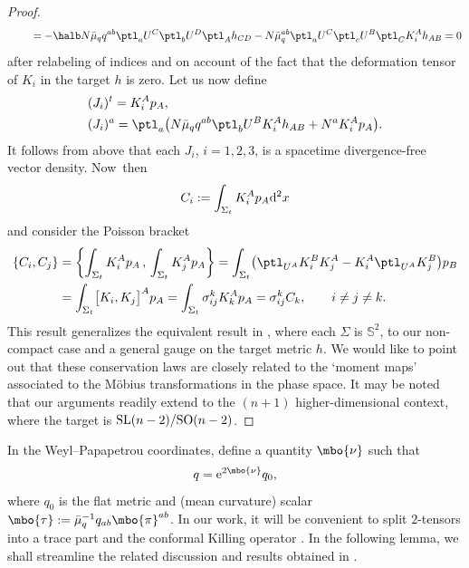 \begin{proof}
\begin{gather*}
\qquad{}= -\halb N \bar{\mu}_q q^{ab} \ptl_a U^C \ptl_b U^D \ptl_A h_{CD}- N \bar{\mu}_q^{ab} \ptl_a U^C \ptl_c U^B \ptl_C K_i^A h_{AB} = 0
\end{gather*}
after relabeling of indices and on account of the fact that the deformation tensor of $K_i$ in the target $h$ is zero. Let us now define
\begin{align*}
&(J_i)^t = K^A_i p_A,\\
&(J_i)^a = \ptl_a \bigl(N \bar{\mu}_q q^{ab} \ptl_b U^B K_i^A h_{AB} + N^a K_i^A p_A\bigr).
\end{align*}
It follows from above that each $J_i$, $i = 1, 2, 3$, is a spacetime divergence-free vector density. Now~then
\begin{align*}
C_i := \int_{\Sigma_t}K_i^A p_A {\rm d}^2 x
\end{align*}
and consider the Poisson bracket
\begin{align*}
\{ C_i, C_j \} &{}= \biggl\{ \int_{\Sigma_t} K^A_i p_A \,,\, \int_{\Sigma_t} K^A_j p_A \biggr\}
= \int_{\Sigma_t} \bigl(\ptl_{U^A} K^B_i K^A_j - K^A_i \ptl_{U^A} K^B_j \bigr) p_B \\
&{}= \int_{\Sigma_t} \bigl[K_i, K_j \bigr]^A p_A = \int_{\Sigma_t} \sigma^k_{ij} K^A_k p_A
= \sigma^k_{ij} C_k, \qquad i \neq j \neq k.
\end{align*}
This result generalizes the equivalent result in \cite{kaluz1}, where each $\Sigma$ is $\mathbb{S}^2$, to our non-compact case and a general gauge on the target metric $h$. We would like to point out that these conservation laws are closely related to the `moment maps' associated to the M\"obius transformations in the phase space. It may be noted that our arguments readily extend to the $(n+1)$ higher-dimensional context, where the target is ${\rm SL}(n-2)/{\rm SO}(n-2)$.
\end{proof}

In the Weyl--Papapetrou coordinates, define a quantity $\mbo{\nu}$ such that
\begin{align} \label{conformal}
q= {\rm e}^{2\mbo{\nu}} q_0,
\end{align}
where $q_0$ is the flat metric and (mean curvature) scalar $\mbo{\tau} := \bar{\mu}^{-1}_q q_{ab} \mbo{\pi}^{ab}$. In our work, it will be convenient to split $2$-tensors into a trace part and the conformal Killing operator \cite{kaluz1}. In the following lemma, we shall streamline the related discussion and results obtained in \cite{kaluz1}.

